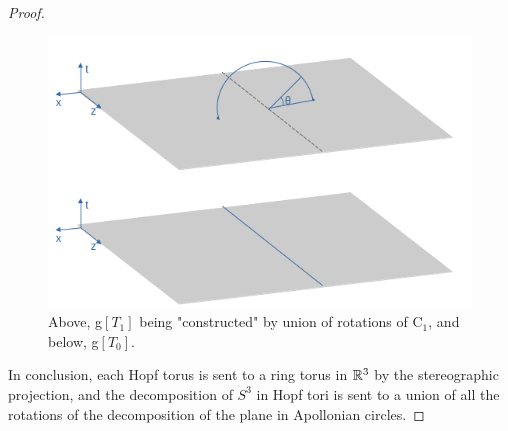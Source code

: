 \begin{proof}
\begin{figure}[H]
    \centering
    \includegraphics[scale=0.50]{gC0gC1.png}
    \caption{Above, g$[T_1]$ being "constructed" by union of rotations of C$_1$, and below, g$[T_0]$.}
    \label{fig:gC0gC1}
\end{figure}

In conclusion, each Hopf torus is sent to a ring torus in $\mathbb{R}^3$ by the stereographic projection, and the decomposition of $S^3$ in Hopf tori is sent to a union of all the rotations of the decomposition of the plane in Apollonian circles.
\end{proof}